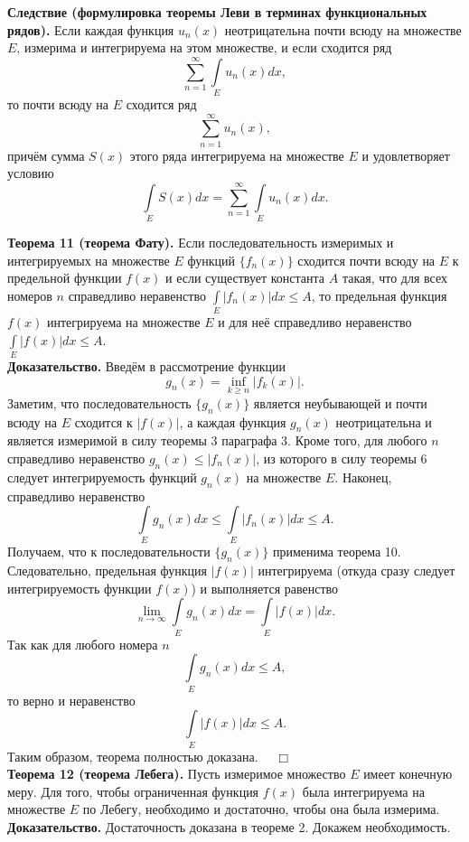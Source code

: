 \documentclass[12pt,a4paper, titlepage]{article}
\begin{document}
\textbf{Следствие (формулировка теоремы Леви в терминах функциональных рядов).} Если каждая функция $u_n(x)$ неотрицательна почти всюду на множестве $E$, измерима и интегрируема на этом множестве, и если сходится ряд
$$
\sum_{n=1}^\infty \int\limits_E u_n(x) dx,
$$
то почти всюду на $E$ сходится ряд
$$
\sum_{n=1}^\infty u_n(x),
$$
причём сумма $S(x)$ этого ряда интегрируема на множестве $E$ и удовлетворяет условию
$$
\int\limits_E S(x) dx = \sum_{n=1}^\infty \int\limits_E u_n(x) dx.
$$

\textbf{Теорема 11 (теорема Фату).} Если последовательность измеримых и интегрируемых на множестве $E$ функций $\lbrace f_n(x) \rbrace$ сходится почти всюду на $E$ к предельной функции $f(x)$ и если существует константа $A$ такая, что для всех номеров $n$ справедливо неравенство $\int\limits_E |f_n(x)| dx \leqslant A$, то предельная функция $f(x)$ интегрируема на множестве $E$ и для неё справедливо неравенство $\int\limits_E |f(x)| dx \leqslant A$.\\
\textbf{Доказательство.} Введём в рассмотрение функции
$$
g_n(x) = \inf_{k \geqslant n} |f_k(x)|.
$$
Заметим, что последовательность $\lbrace g_n(x) \rbrace$ является неубывающей и почти всюду на $E$ сходится к $|f(x)|$, а каждая функция $g_n(x)$ неотрицательна и является измеримой в силу теоремы 3 параграфа 3. Кроме того, для любого $n$ справедливо неравенство $g_n(x) \leqslant |f_n(x)|$, из которого в силу теоремы 6 следует интегрируемость функций $g_n(x)$ на множестве $E$. Наконец, справедливо неравенство
$$
\int\limits_E g_n(x) dx \leqslant \int\limits_E |f_n(x)| dx \leqslant A.
$$
Получаем, что к последовательности $\lbrace g_n(x) \rbrace$ применима теорема 10. Следовательно, предельная функция $|f(x)|$ интегрируема (откуда сразу следует интегрируемость функции $f(x)$) и выполняется равенство
$$
\lim_{n\to\infty} \int\limits_E g_n(x) dx = \int\limits_E |f(x)| dx.
$$
Так как для любого номера $n$
$$
\int\limits_E g_n(x) dx \leqslant A,
$$
то верно и неравенство
$$
\int\limits_E |f(x)| dx \leqslant A.
$$
Таким образом, теорема полностью доказана. $\quad \Box$\\












\textbf{Теорема 12 (теорема Лебега).} Пусть измеримое множество $E$ имеет конечную меру. Для того, чтобы ограниченная функция $f(x)$ была интегрируема на множестве $E$ по Лебегу, необходимо и достаточно, чтобы она была измерима.\\
\textbf{Доказательство.}
Достаточность доказана в теореме 2. Докажем необходимость.\\
\end{document}
